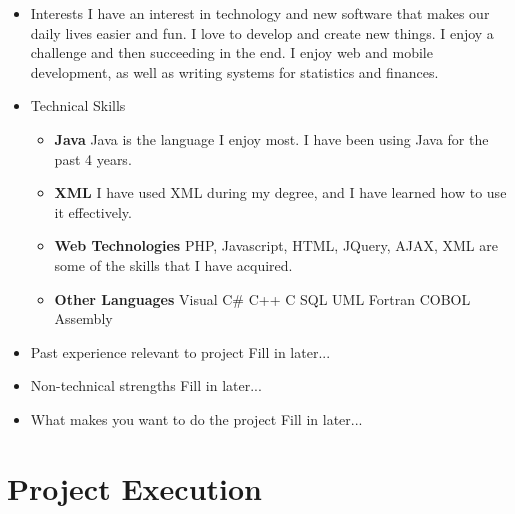 \documentclass[12pt, oneside]{article}
\begin{document}
\begin{enumerate}
\begin{itemize}
			\item Interests\newline
				I have an interest in technology and new software that makes our daily lives easier and fun. I love to 						develop and create new things. I enjoy a challenge and then succeeding in the end. I enjoy web and 						mobile development, as well as writing systems for statistics and finances.
			\item Technical Skills\newline
				\begin{itemize}
				\item {\bf Java}\newline
					Java is the language I enjoy most. I have been using Java for the past 4 years.
				\item {\bf XML}\newline
					I have used XML during my degree, and I have learned how to use it effectively.
				\item {\bf Web Technologies}\newline
					PHP, Javascript, HTML, JQuery, AJAX, XML are some of the skills that I have acquired.
				\item {\bf Other Languages}\newline
					Visual C\#\newline
					C++\newline
					C\newline
					SQL\newline
					UML\newline	
					Fortran\newline
					COBOL\newline
					Assembly\newline
				\end{itemize}
			\item Past experience relevant to project\newline
				Fill in later...
			\item Non-technical strengths\newline
				Fill in later...
			\item What makes you want to do the project\newline
				Fill in later...
		\end{itemize}
	\end{enumerate}
	
\section{Project Execution}
\end{document}
